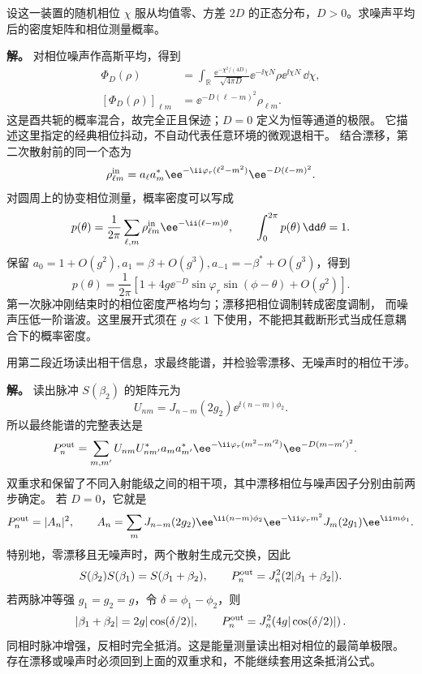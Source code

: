\begin{exbox}
设这一装置的随机相位 $\chi$ 服从均值零、方差 $2D$ 的正态分布，$D>0$。求噪声平均后的密度矩阵和相位测量概率。

\textbf{解。} 对相位噪声作高斯平均，得到
\begin{align*}
 \Phi_D(\rho)&=\int_{\mathbb R}\frac{\ee^{-\chi^2/(4D)}}{\sqrt{4\pi D}}
 \ee^{-\ii \chi N}\rho \ee^{\ii \chi N}\,\dd\chi,\\
 [\Phi_D(\rho)]_{\ell m}&=\ee^{-D(\ell-m)^2}\rho_{\ell m}.
\end{align*}
这是酉共轭的概率混合，故完全正且保迹；$D=0$ 定义为恒等通道的极限。
它描述这里指定的经典相位抖动，不自动代表任意环境的微观退相干。
结合漂移，第二次散射前的同一个态为
\[
 \rho^{\rm in}_{\ell m}
 =a_\ell a_m^*\ee^{-\ii \varphi_r(\ell^2-m^2)}\ee^{-D(\ell-m)^2}.
\]
对圆周上的协变相位测量，概率密度可以写成
\[
 p(\theta)=\frac1{2\pi}\sum_{\ell,m}
 \rho^{\rm in}_{\ell m}\ee^{-\ii (\ell-m)\theta},\qquad
 \int_0^{2\pi}p(\theta)\,\dd\theta=1.
\]
保留 $a_0=1+O(g^2),a_1=\beta+O(g^3),a_{-1}=-\beta^*+O(g^3)$，得到
\[
 p(\theta)=\frac1{2\pi}
 \left[1+4g \ee^{-D}\sin\varphi_r\sin(\phi-\theta)+O(g^2)\right].
\]
第一次脉冲刚结束时的相位密度严格均匀；漂移把相位调制转成密度调制，
而噪声压低一阶谐波。这里展开式须在 $g\ll1$ 下使用，不能把其截断形式当成任意耦合下的概率密度。
\end{exbox}

\begin{exbox}
用第二段近场读出相干信息，求最终能谱，并检验零漂移、无噪声时的相位干涉。

\textbf{解。} 读出脉冲 $S(\beta_2)$ 的矩阵元为
\[
 U_{nm}=J_{n-m}(2g_2)\ee^{\ii (n-m)\phi_2}.
\]
所以最终能谱的完整表达是
\begin{align*}
 P_n^{\rm out}
 &=\sum_{m,m'}U_{nm}U_{nm'}^*a_ma_{m'}^*
 \ee^{-\ii \varphi_r(m^2-m'^2)}\ee^{-D(m-m')^2}.
\end{align*}
双重求和保留了不同入射能级之间的相干项，其中漂移相位与噪声因子分别由前两步确定。
若 $D=0$，它就是
\[
 P_n^{\rm out}=|A_n|^2,\qquad
 A_n=\sum_mJ_{n-m}(2g_2)\ee^{\ii (n-m)\phi_2}
 \ee^{-\ii \varphi_rm^2}J_m(2g_1)\ee^{\ii m\phi_1}.
\]
特别地，零漂移且无噪声时，两个散射生成元交换，因此
\[
 S(\beta_2)S(\beta_1)=S(\beta_1+\beta_2),\qquad
 P_n^{\rm out}=J_n^2(2|\beta_1+\beta_2|).
\]
若两脉冲等强 $g_1=g_2=g$，令 $\delta=\phi_1-\phi_2$，则
\[
 |\beta_1+\beta_2|=2g|\cos(\delta/2)|,
 \qquad P_n^{\rm out}=J_n^2\!\left(4g|\cos(\delta/2)|\right).
\]
同相时脉冲增强，反相时完全抵消。这是能量测量读出相对相位的最简单极限。
存在漂移或噪声时必须回到上面的双重求和，不能继续套用这条抵消公式。
\end{exbox}

